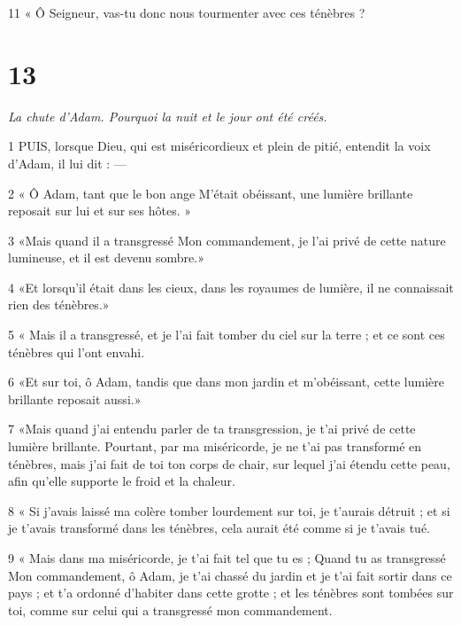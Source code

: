 \par 11 « Ô Seigneur, vas-tu donc nous tourmenter avec ces ténèbres ?

\chapter{13}

\par \textit{La chute d'Adam. Pourquoi la nuit et le jour ont été créés.}

\par 1 PUIS, lorsque Dieu, qui est miséricordieux et plein de pitié, entendit la voix d'Adam, il lui dit : —

\par 2 « Ô Adam, tant que le bon ange M'était obéissant, une lumière brillante reposait sur lui et sur ses hôtes. »

\par 3 «Mais quand il a transgressé Mon commandement, je l'ai privé de cette nature lumineuse, et il est devenu sombre.»

\par 4 «Et lorsqu'il était dans les cieux, dans les royaumes de lumière, il ne connaissait rien des ténèbres.»

\par 5 « Mais il a transgressé, et je l'ai fait tomber du ciel sur la terre ; et ce sont ces ténèbres qui l’ont envahi.

\par 6 «Et sur toi, ô Adam, tandis que dans mon jardin et m'obéissant, cette lumière brillante reposait aussi.»

\par 7 «Mais quand j'ai entendu parler de ta transgression, je t'ai privé de cette lumière brillante. Pourtant, par ma miséricorde, je ne t'ai pas transformé en ténèbres, mais j'ai fait de toi ton corps de chair, sur lequel j'ai étendu cette peau, afin qu'elle supporte le froid et la chaleur.

\par 8 « Si j'avais laissé ma colère tomber lourdement sur toi, je t'aurais détruit ; et si je t'avais transformé dans les ténèbres, cela aurait été comme si je t'avais tué.

\par 9 « Mais dans ma miséricorde, je t'ai fait tel que tu es ; Quand tu as transgressé Mon commandement, ô Adam, je t'ai chassé du jardin et je t'ai fait sortir dans ce pays ; et t'a ordonné d'habiter dans cette grotte ; et les ténèbres sont tombées sur toi, comme sur celui qui a transgressé mon commandement.


